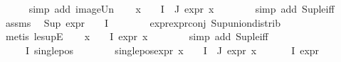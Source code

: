 \begin{isabellebody}
\ \ \ \ \isamarkupfalse%
\ {\isacharparenleft}{\kern0pt}simp\ add{\isacharcolon}{\kern0pt}\ image{\isacharunderscore}{\kern0pt}Un{\isacharparenright}{\kern0pt}\isanewline
\ \ \isamarkupfalse%
\ {\isachardoublequoteopen}{\isasymforall}x\ {\isasymin}\ {\isasymPhi}\ {\isacharbackquote}{\kern0pt}\ {\isacharparenleft}{\kern0pt}I\ {\isasymunion}\ J{\isacharparenright}{\kern0pt}{\isachardot}{\kern0pt}\ expr{\isacharunderscore}{\kern0pt}{}\ x\ {\isacharless}{\kern0pt}{\isacharequal}{\kern0pt}\ {}{\isachardoublequoteclose}\isanewline
\ \ \ \ \isamarkupfalse%
\ {\isacharparenleft}{\kern0pt}simp\ add{\isacharcolon}{\kern0pt}\ Sup{\isacharunderscore}{\kern0pt}le{\isacharunderscore}{\kern0pt}iff{\isacharparenright}{\kern0pt}\isanewline
\ \ \isamarkupfalse%
\ assms\ \isamarkupfalse%
\ {\isachardoublequoteopen}{\isacharparenleft}{\kern0pt}Sup\ {\isacharparenleft}{\kern0pt}{\isacharparenleft}{\kern0pt}expr{\isacharunderscore}{\kern0pt}{}\ {\isasymcirc}\ {\isasymPhi}{\isacharparenright}{\kern0pt}\ {\isacharbackquote}{\kern0pt}\ I{\isacharparenright}{\kern0pt}{\isacharparenright}{\kern0pt}\ {\isasymle}\ {}{\isachardoublequoteclose}\isanewline
\ \ \ \ \isamarkupfalse%
\ expr{\isacharunderscore}{\kern0pt}{}{\isachardot}{\kern0pt}expr{\isacharunderscore}{\kern0pt}{}{\isacharunderscore}{\kern0pt}conj\ Sup{\isacharunderscore}{\kern0pt}union{\isacharunderscore}{\kern0pt}distrib\isanewline
\ \ \ \ \isamarkupfalse%
\ {\isacharparenleft}{\kern0pt}metis\ le{\isacharunderscore}{\kern0pt}supE{\isacharparenright}{\kern0pt}\isanewline
\ \ \isamarkupfalse%
\ {\isachardoublequoteopen}{\isasymforall}x\ {\isasymin}\ {\isasymPhi}\ {\isacharbackquote}{\kern0pt}\ I{\isachardot}{\kern0pt}\ expr{\isacharunderscore}{\kern0pt}{}\ x\ {\isasymle}\ {}{\isachardoublequoteclose}\isanewline
\ \ \ \ \isamarkupfalse%
\ {\isacharparenleft}{\kern0pt}simp\ add{\isacharcolon}{\kern0pt}\ Sup{\isacharunderscore}{\kern0pt}le{\isacharunderscore}{\kern0pt}iff{\isacharparenright}{\kern0pt}\isanewline
\ \ \isamarkupfalse%
\ {\isachardoublequoteopen}{\isasymforall}{\isasympsi}\ {\isasymin}\ {\isasymPhi}\ {\isacharbackquote}{\kern0pt}\ I{\isachardot}{\kern0pt}\ single{\isacharunderscore}{\kern0pt}pos\ {\isasympsi}{\isachardoublequoteclose}\ \isanewline
\ \ \ \ \isamarkupfalse%
\ single{\isacharunderscore}{\kern0pt}pos{\isacharunderscore}{\kern0pt}expr\ {\isacartoucheopen}{\isasymforall}x\ {\isasymin}\ {\isasymPhi}\ {\isacharbackquote}{\kern0pt}\ {\isacharparenleft}{\kern0pt}I\ {\isasymunion}\ J{\isacharparenright}{\kern0pt}{\isachardot}{\kern0pt}\ expr{\isacharunderscore}{\kern0pt}{}\ x\ {\isacharless}{\kern0pt}{\isacharequal}{\kern0pt}\ {}{\isacartoucheclose}\ {\isacartoucheopen}{\isasymforall}{\isasymphi}\ {\isasymin}\ {\isasymPhi}\ {\isacharbackquote}{\kern0pt}\ I{\isachardot}{\kern0pt}\ expr{\isacharunderscore}{\kern0pt}{}\ {\isasymphi}\ {\isasymle}\ {}{\isacartoucheclose}\isanewline

\end{isabellebody}
